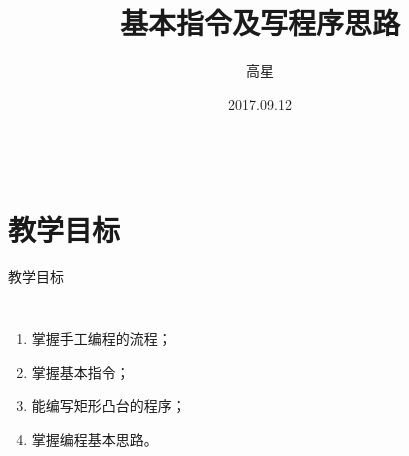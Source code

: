 \documentclass[UTF8,zihao=-4]{ctexbeamer}
\title{基本指令及写程序思路}
\author{高星}
\institute{湖南潇湘技师学院~湖南九嶷职院}
\date{2017.09.12}
\begin{document}
    
\begin{frame}[plain]
		\maketitle
\end{frame}

\begin{frame}
\begin{columns}
\tableofcontents[hideallsubsections]
\end{columns}
\end{frame}

\section*{教学目标}

\begin{frame}{教学目标}
    \begin{columns}
        \begin{enumerate}
            \item 掌握手工编程的流程；
            \item 掌握基本指令；
            \item 能编写矩形凸台的程序；
            \item 掌握编程基本思路。
        \end{enumerate}
    \end{columns}
\end{frame}
\end{document}
